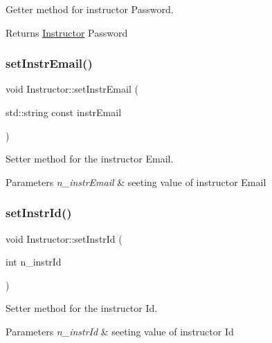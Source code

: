 Getter method for instructor Password. 

\begin{DoxyReturn}{Returns}
\hyperlink{class_instructor}{Instructor} Password 
\end{DoxyReturn}
\mbox{\label{class_instructor_a99b99002bf23dba78dc65043c7d87c5d}} 
\subsubsection{\texorpdfstring{set\+Instr\+Email()}{setInstrEmail()}}
{\footnotesize\ttfamily void Instructor\+::set\+Instr\+Email (\begin{DoxyParamCaption}\item[{std\+::string const}]{instr\+Email }\end{DoxyParamCaption})}



Setter method for the instructor Email. 


\begin{DoxyParams}{Parameters}
{\em n\+\_\+instr\+Email} & seeting value of instructor Email \\
\hline
\end{DoxyParams}
\mbox{\label{class_instructor_a91ec2cfd9d228fbed7a6019f4e81eb5c}} 
\subsubsection{\texorpdfstring{set\+Instr\+Id()}{setInstrId()}}
{\footnotesize\ttfamily void Instructor\+::set\+Instr\+Id (\begin{DoxyParamCaption}\item[{int}]{n\+\_\+instr\+Id }\end{DoxyParamCaption})}



Setter method for the instructor Id. 


\begin{DoxyParams}{Parameters}
{\em n\+\_\+instr\+Id} & seeting value of instructor Id \\
\hline
\end{DoxyParams}
\mbox{\label{class_instructor_aaa6d77244009f29a2e5e1acc3d18220c}} 

